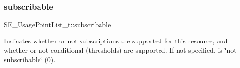 \subsubsection{\texorpdfstring{subscribable}{subscribable}}
{\footnotesize\ttfamily S\+E\+\_\+\+Usage\+Point\+List\+\_\+t\+::subscribable}

Indicates whether or not subscriptions are supported for this resource, and whether or not conditional (thresholds) are supported. If not specified, is \char`\"{}not subscribable\char`\"{} (0). 